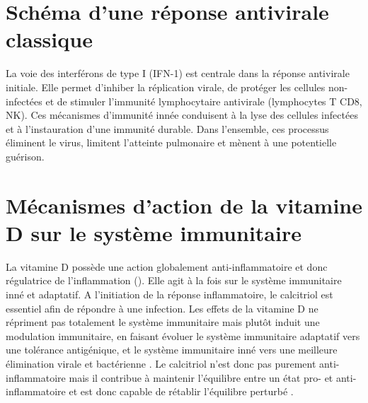 \documentclass[
  a4paper,
  DIV=11,
  numbers=noendperiod,
  listof=totoc]{scrreprt}
\begin{document}
\section{Schéma d'une réponse antivirale
classique}\label{schuxe9ma-dune-ruxe9ponse-antivirale-classique}

La voie des interférons de type I (IFN-1) est centrale dans la réponse
antivirale initiale. Elle permet d'inhiber la réplication virale, de
protéger les cellules non-infectées et de stimuler l'immunité
lymphocytaire antivirale (lymphocytes T CD8, NK). Ces mécanismes
d'immunité innée conduisent à la lyse des cellules infectées et à
l'instauration d'une immunité durable. Dans l'ensemble, ces processus
éliminent le virus, limitent l'atteinte pulmonaire et mènent à une
potentielle guérison.

\section{Mécanismes d'action de la vitamine D sur le système
immunitaire}\label{muxe9canismes-daction-de-la-vitamine-d-sur-le-systuxe8me-immunitaire}

La vitamine D possède une action globalement anti-inflammatoire et donc
régulatrice de l'inflammation (). Elle agit à
la fois sur le système immunitaire inné et adaptatif. A l'initiation de
la réponse inflammatoire, le calcitriol est essentiel afin de répondre à
une infection. Les effets de la vitamine D ne répriment pas totalement
le système immunitaire mais plutôt induit une modulation immunitaire, en
faisant évoluer le système immunitaire adaptatif vers une tolérance
antigénique, et le système immunitaire inné vers une meilleure
élimination virale et bactérienne \autocite{Martens.2020}. Le calcitriol
n'est donc pas purement anti-inflammatoire mais il contribue à maintenir
l'équilibre entre un état pro- et anti-inflammatoire et est donc capable
de rétablir l'équilibre perturbé \autocite{Dankers.2017}.
\end{document}
